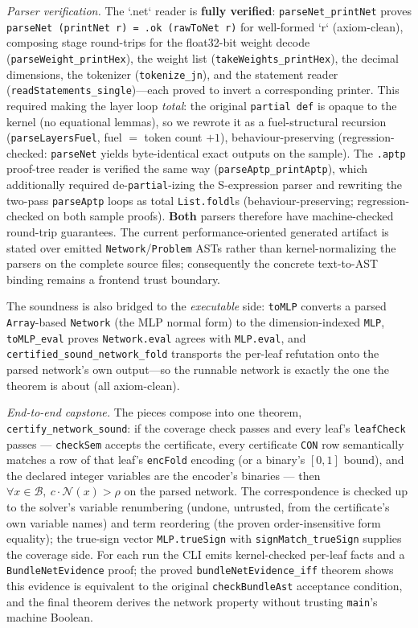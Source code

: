 \documentclass[runningheads]{llncs}
\newcommand{\net}{\mathcal{N}}
\newcommand{\dom}{\mathcal{B}}          %
\newcommand{\code}[1]{\texttt{#1}}
\begin{document}
\emph{Parser verification.} The `.net` reader is \textbf{fully verified}:
\code{parseNet\_printNet} proves \code{parseNet (printNet r) = .ok (rawToNet r)} for
well-formed `r` (axiom-clean), composing stage round-trips for the float32-bit weight
decode (\code{parseWeight\_printHex}), the weight list (\code{takeWeights\_printHex}),
the decimal dimensions, the tokenizer (\code{tokenize\_jn}), and the statement reader
(\code{readStatements\_single})---each proved to invert a corresponding printer. This
required making the layer loop \emph{total}: the original \code{partial def} is opaque
to the kernel (no equational lemmas), so we rewrote it as a fuel-structural recursion
(\code{parseLayersFuel}, fuel $=$ token count $+1$), behaviour-preserving
(regression-checked: \code{parseNet} yields byte-identical exact outputs on the
sample). The \code{.aptp} proof-tree reader is verified the same way
(\code{parseAptp\_printAptp}), which additionally required de-\code{partial}-izing the
S-expression parser and rewriting the two-pass \code{parseAptp} loops as total
\code{List.foldl}s (behaviour-preserving; regression-checked on both sample proofs).
\textbf{Both} parsers therefore have machine-checked round-trip guarantees. The
current performance-oriented generated artifact is stated over emitted
\code{Network}/\code{Problem} ASTs rather than kernel-normalizing the parsers on the
complete source files; consequently the concrete text-to-AST binding remains a
frontend trust boundary.

The soundness is also bridged to the \emph{executable} side: \code{toMLP} converts a
parsed \code{Array}-based \code{Network} (the MLP normal form) to the
dimension-indexed \code{MLP}, \code{toMLP\_eval} proves \code{Network.eval} agrees with
\code{MLP.eval}, and \code{certified\_sound\_network\_fold} transports the per-leaf
refutation onto the parsed network's own output---so the runnable network is exactly
the one the theorem is about (all axiom-clean).

\emph{End-to-end capstone.} The pieces compose into one theorem,
\code{certify\_network\_sound}: if the coverage check passes and every leaf's
\code{leafCheck} passes --- \code{checkSem} accepts the certificate, every certificate
\code{CON} row semantically matches a row of that leaf's \code{encFold} encoding (or a
binary's $[0,1]$ bound), and the declared integer variables are the encoder's binaries
--- then $\forall x\in\dom,\ c\cdot\net(x)>\rho$ on the parsed network. The
correspondence is checked up to the solver's variable renumbering (undone, untrusted,
from the certificate's own variable names) and term reordering (the proven
order-insensitive form equality); the true-sign vector \code{MLP.trueSign} with
\code{signMatch\_trueSign} supplies the coverage side. For each run the CLI emits
kernel-checked per-leaf facts and a \code{BundleNetEvidence} proof; the proved
\code{bundleNetEvidence\_iff} theorem shows this evidence is equivalent to the
original \code{checkBundleAst} acceptance condition, and the final theorem derives
the network property without trusting \code{main}'s machine Boolean.
\end{document}

